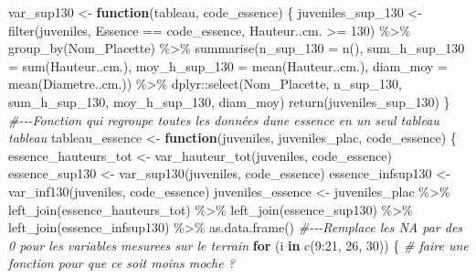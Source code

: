 \documentclass[
  12pt,
  american,
  a4paper,
  extrafontsizes,onecolumn,openright
  ]{memoir}
\newenvironment{Shaded}{\begin{snugshade}}{\end{snugshade}}
\newcommand{\AttributeTok}[1]{\textcolor[rgb]{0.77,0.63,0.00}{#1}}
\newcommand{\CommentTok}[1]{\textcolor[rgb]{0.56,0.35,0.01}{\textit{#1}}}
\newcommand{\ControlFlowTok}[1]{\textcolor[rgb]{0.13,0.29,0.53}{\textbf{#1}}}
\newcommand{\DecValTok}[1]{\textcolor[rgb]{0.00,0.00,0.81}{#1}}
\newcommand{\FunctionTok}[1]{\textcolor[rgb]{0.00,0.00,0.00}{#1}}
\newcommand{\NormalTok}[1]{#1}
\newcommand{\OtherTok}[1]{\textcolor[rgb]{0.56,0.35,0.01}{#1}}
\newcommand{\SpecialCharTok}[1]{\textcolor[rgb]{0.00,0.00,0.00}{#1}}
\begin{document}
\begin{Shaded}
\begin{Highlighting}[]
\NormalTok{var\_sup130 }\OtherTok{\textless{}{-}} \ControlFlowTok{function}\NormalTok{(tableau, code\_essence) \{}
\NormalTok{    juveniles\_sup\_130 }\OtherTok{\textless{}{-}} \FunctionTok{filter}\NormalTok{(juveniles, Essence }\SpecialCharTok{==}\NormalTok{ code\_essence,}
\NormalTok{        Hauteur..cm. }\SpecialCharTok{\textgreater{}=} \DecValTok{130}\NormalTok{) }\SpecialCharTok{\%\textgreater{}\%}
        \FunctionTok{group\_by}\NormalTok{(Nom\_Placette) }\SpecialCharTok{\%\textgreater{}\%}
        \FunctionTok{summarise}\NormalTok{(}\AttributeTok{n\_sup\_130 =} \FunctionTok{n}\NormalTok{(), }\AttributeTok{sum\_h\_sup\_130 =} \FunctionTok{sum}\NormalTok{(Hauteur..cm.),}
            \AttributeTok{moy\_h\_sup\_130 =} \FunctionTok{mean}\NormalTok{(Hauteur..cm.), }\AttributeTok{diam\_moy =} \FunctionTok{mean}\NormalTok{(Diametre..cm.)) }\SpecialCharTok{\%\textgreater{}\%}
\NormalTok{        dplyr}\SpecialCharTok{::}\FunctionTok{select}\NormalTok{(Nom\_Placette, n\_sup\_130, sum\_h\_sup\_130,}
\NormalTok{            moy\_h\_sup\_130, diam\_moy)}
    \FunctionTok{return}\NormalTok{(juveniles\_sup\_130)}
\NormalTok{\}}
\CommentTok{\#{-}{-}{-}Fonction qui regroupe toutes les données d\textquotesingle{}une essence en un seul tableau tableau}
\NormalTok{tableau\_essence }\OtherTok{\textless{}{-}} \ControlFlowTok{function}\NormalTok{(juveniles, juveniles\_plac, code\_essence) \{}
\NormalTok{    essence\_hauteurs\_tot }\OtherTok{\textless{}{-}} \FunctionTok{var\_hauteur\_tot}\NormalTok{(juveniles, code\_essence)}
\NormalTok{    essence\_sup130 }\OtherTok{\textless{}{-}} \FunctionTok{var\_sup130}\NormalTok{(juveniles, code\_essence)}
\NormalTok{    essence\_infsup130 }\OtherTok{\textless{}{-}} \FunctionTok{var\_inf130}\NormalTok{(juveniles, code\_essence)}
\NormalTok{    juveniles\_essence }\OtherTok{\textless{}{-}}\NormalTok{ juveniles\_plac }\SpecialCharTok{\%\textgreater{}\%}
        \FunctionTok{left\_join}\NormalTok{(essence\_hauteurs\_tot) }\SpecialCharTok{\%\textgreater{}\%}
        \FunctionTok{left\_join}\NormalTok{(essence\_sup130) }\SpecialCharTok{\%\textgreater{}\%}
        \FunctionTok{left\_join}\NormalTok{(essence\_infsup130) }\SpecialCharTok{\%\textgreater{}\%}
        \FunctionTok{as.data.frame}\NormalTok{()}
    \CommentTok{\#{-}{-}{-}Remplace les NA par des 0 pour les variables mesurees sur le terrain}
    \ControlFlowTok{for}\NormalTok{ (i }\ControlFlowTok{in} \FunctionTok{c}\NormalTok{(}\DecValTok{9}\SpecialCharTok{:}\DecValTok{21}\NormalTok{, }\DecValTok{26}\NormalTok{, }\DecValTok{30}\NormalTok{)) \{}
        \CommentTok{\# faire une fonction pour que ce soit moins moche ?}

\end{Highlighting}
\end{Shaded}
\end{document}
